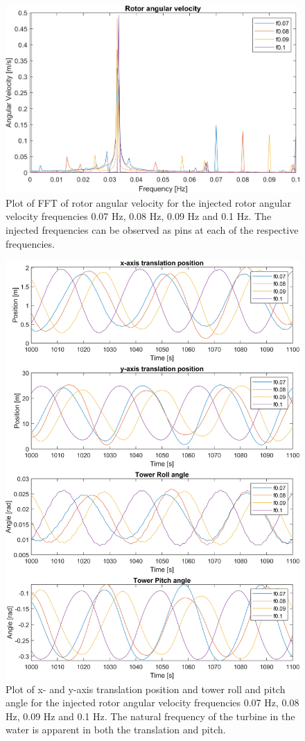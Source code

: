 \begin{figure}[ht]
	\centering
	\includegraphics[width=0.8\linewidth]{Graphics/TestResults/tj00/tjj0_f07to1_OmegaFFT.png}
	\caption{Plot of FFT of rotor angular velocity for the injected rotor angular velocity frequencies 0.07 Hz, 0.08 Hz, 0.09 Hz and 0.1 Hz. The injected frequencies can be observed as pins at each of the respective frequencies.}
	\label{fig:tjj0_f07to1_OmegaFFT}
\end{figure}

\begin{figure}[ht]
	\centering
	\includegraphics[width=0.8\linewidth]{Graphics/TestResults/tj00/tjj0_f07to1_xPosToPitchAng.png}
	\caption{Plot of x- and y-axis translation position and tower roll and pitch angle for the injected rotor angular velocity frequencies 0.07 Hz, 0.08 Hz, 0.09 Hz and 0.1 Hz. The natural frequency of the turbine in the water is apparent in both the translation and pitch.}
	\label{fig:tjj0_f07to1_xPosToPitchAng}
\end{figure}

